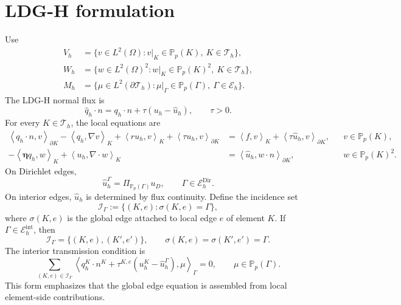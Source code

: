 \documentclass[11pt]{article}
\newcommand{\T}{\mathcal T_h}
\newcommand{\E}{\mathcal E_h}
\newcommand{\Eint}{\mathcal E_h^{\mathrm{int}}}
\newcommand{\Edir}{\mathcal E_h^{\mathrm{Dir}}}
\newcommand{\p}{\mathbb P}
\newcommand{\I}{\mathcal I}
\newcommand{\etab}{\boldsymbol\eta}
\newcommand{\inner}[2]{\left\langle #1,#2\right\rangle}
\begin{document}
\section{LDG-H formulation}

Use
\begin{align*}
    V_h &= \{v\in L^2(\Omega):v|_K\in\p_p(K),\ K\in\T\},\\
    W_h &= \{w\in L^2(\Omega)^2:w|_K\in\p_p(K)^2,\ K\in\T\},\\
    M_h &= \{\mu\in L^2(\partial\T):\mu|_\Gamma\in\p_p(\Gamma),\ \Gamma\in\E\}.
\end{align*}
The LDG-H normal flux is
\begin{equation}\label{eq:num-flux}
    \widehat q_h\cdot n=q_h\cdot n+\tau(u_h-\widehat u_h),
    \qquad \tau>0.
\end{equation}
For every $K\in\T$, the local equations are
\begin{align}
    \inner{q_h\cdot n}{v}_{\partial K}
    -\inner{q_h}{\nabla v}_{K}
    +\inner{ru_h}{v}_{K}
    +\inner{\tau u_h}{v}_{\partial K}
        &=\inner{f}{v}_{K}+\inner{\tau\widehat u_h}{v}_{\partial K},
        &&v\in\p_p(K), \label{eq:hdg-u}\\
    -\inner{\etab q_h}{w}_{K}
    +\inner{u_h}{\nabla\cdot w}_{K}
        &=\inner{\widehat u_h}{w\cdot n}_{\partial K},
        &&w\in\p_p(K)^2. \label{eq:hdg-q}
\end{align}
On Dirichlet edges,
\begin{equation}\label{eq:dirichlet-trace}
    \widehat u_h^\Gamma=\Pi_{\p_p(\Gamma)}u_D,
    \qquad \Gamma\in\Edir.
\end{equation}
On interior edges, $\widehat u_h$ is determined by flux continuity. Define the incidence set
\begin{equation}\label{eq:incidence-set}
    \I_\Gamma:=\{(K,e):\sigma(K,e)=\Gamma\},
\end{equation}
where $\sigma(K,e)$ is the global edge attached to local edge $e$ of element $K$. If $\Gamma\in\Eint$, then
\[
    \I_\Gamma=\{(K,e),(K',e')\},
    \qquad
    \sigma(K,e)=\sigma(K',e')=\Gamma .
\]
The interior transmission condition is
\begin{equation}\label{eq:flux-continuity}
    \sum_{(K,e)\in\I_\Gamma}
    \inner{q_h^K\cdot n^K+\tau^{K,e}(u_h^K-\widehat u_h^\Gamma)}{\mu}_{\Gamma}=0,
    \qquad
    \mu\in\p_p(\Gamma).
\end{equation}
This form emphasizes that the global edge equation is assembled from local element-side contributions.
\end{document}
